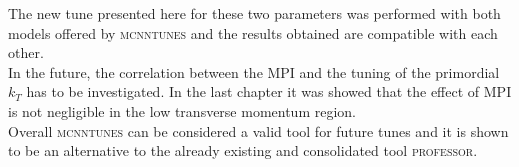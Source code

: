 The new tune presented here for these two parameters was performed with both models offered by \textsc{mcnntunes} and the results obtained are compatible with each other. 
\\
In the future, the correlation between the MPI and the tuning of the primordial $k_T$ has to be investigated. In the last chapter it was showed that the effect of MPI is not negligible in the low transverse momentum region.
\\
Overall \textsc{mcnntunes} can be considered a valid tool for future tunes and it is shown to be an alternative to the already existing and consolidated tool \textsc{professor}. 
 